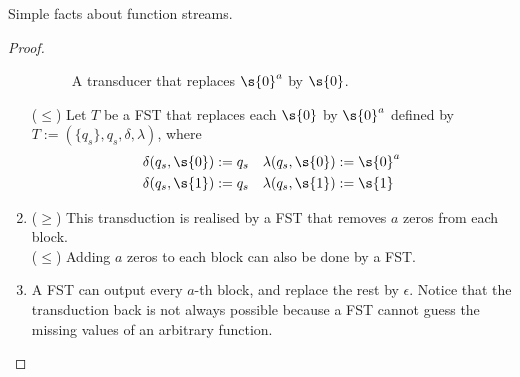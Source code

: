 \begin{lemma}{Simple facts about function streams.}
\begin{proof}
\begin{enumerate}
\begin{figure}[H]
				\caption{A transducer that replaces $\s{0}^a$ by $\s{0}$.}
				\label{fig:simple_fs_facts.shift}
			\end{figure}
			($\leq$) Let $T$ be a FST that replaces each $\s{0}$ by $\s{0}^a$ defined by $T := (\{q_s\},q_s,\delta,\lambda)$, where
			\begin{align*}
				\delta(q_s, \s{0}) &:= q_s & \lambda(q_s, \s{0}) &:= \s{0}^{a} \\
				\delta(q_s, \s{1}) &:= q_s & \lambda(q_s, \s{1}) &:= \s{1}
			\end{align*}
			\item ($\geq$) This transduction is realised by a FST that removes $a$ zeros from each block. \\
			($\leq$) Adding $a$ zeros to each block can also be done by a FST.
			\item A FST can output every $a$-th block, and replace the rest by $\epsilon$. Notice that the transduction back is not always possible because a FST cannot guess the missing values of an arbitrary function.
		\end{enumerate}
	\end{proof}
\end{lemma}